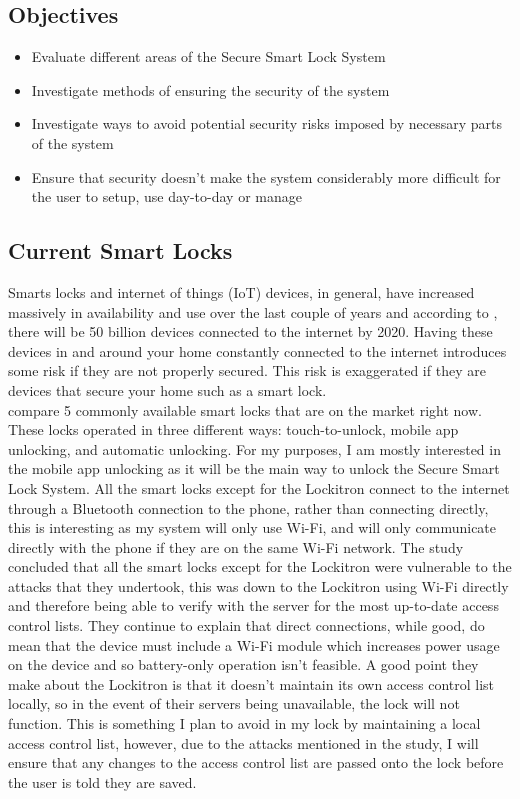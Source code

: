 \documentclass[10pt, a4paper]{article}
\begin{document}
\subsection{Objectives}
\begin{itemize}
	\item {Evaluate different areas of the Secure Smart Lock System}
	\item Investigate methods of ensuring the security of the system
	\item Investigate ways to avoid potential security risks imposed by necessary parts of the system
	\item Ensure that security doesn't make the system considerably more difficult for the user to setup, use day-to-day or manage
\end{itemize}

\subsection{Current Smart Locks}
Smarts locks and internet of things (IoT) devices, in general, have increased massively in availability and use over the last couple of years and according to \cite{Buhov2016}, there will be 50 billion devices connected to the internet by 2020. Having these devices in and around your home constantly connected to the internet introduces some risk if they are not properly secured. This risk is exaggerated if they are devices that secure your home such as a smart lock.
\\
\indent\cite{Ho2016} compare 5 commonly available smart locks that are on the market right now. These locks operated in three different ways: touch-to-unlock, mobile app unlocking, and automatic unlocking. For my purposes, I am mostly interested in the mobile app unlocking as it will be the main way to unlock the Secure Smart Lock System. All the smart locks except for the Lockitron connect to the internet through a Bluetooth connection to the phone, rather than connecting directly, this is interesting as my system will only use Wi-Fi, and will only communicate directly with the phone if they are on the same Wi-Fi network.  The study concluded that all the smart locks except for the Lockitron were vulnerable to the attacks that they undertook, this was down to the Lockitron using Wi-Fi directly and therefore being able to verify with the server for the most up-to-date access control lists. They continue to explain that direct connections, while good, do mean that the device must include a Wi-Fi module which increases power usage on the device and so battery-only operation isn't feasible. A good point they make about the Lockitron is that it doesn't maintain its own access control list locally, so in the event of their servers being unavailable, the lock will not function. This is something I plan to avoid in my lock by maintaining a local access control list, however, due to the attacks mentioned in the study, I will ensure that any changes to the access control list are passed onto the lock before the user is told they are saved.
\end{document}
